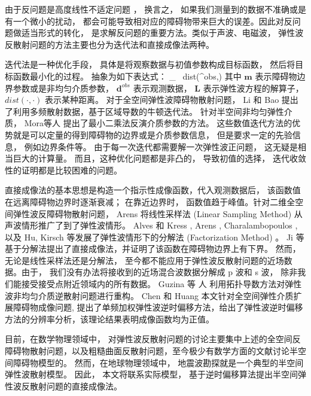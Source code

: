 由于反问题是高度线性不适定问题 \cite{hadamard1923lectures}， 换言之， 如果我们测量到的数据不准确或是有一个微小的扰动， 都会可能导致相对应的障碍物带来巨大的误差。因此对反问题做适当形式的转化， 是求解反问题的重要方法。类似于声波、电磁波， 弹性波反散射问题的方法主要也分为迭代法和直接成像法两种。 

迭代法是一种优化手段， 具体是将观察数据与初值参数构成目标函数， 然后将目标函数最小化的过程。 抽象为如下表达式：
\ben
\min_{} \ dist(^{obs},)
\een
其中 $\mathbf m$ 表示障碍物边界参数或是非均匀介质参数， $\mathbf{d}^{obs}$ 表示观测数据， $\mathbf{{L}}$ 表示弹性波方程的解算子， $dist(\cdot,\cdot)$ 表示某种距离。
对于全空间弹性波障碍物散射问题， Li \cite{li2016inverse} 和 Bao \cite{bao2018direct} 提出了利用多频散射数据，基于区域导数的牛顿迭代法。 针对半空间非均匀弹性介质， Mora等人 \cite{mora1987nonlinear,feng2017elastic,elita2018elastic} 提出了最小二乘法反演介质参数的方法。 这些数值迭代方法的优势就是可以定量的得到障碍物的边界或是介质参数信息， 但是要求一定的先验信息， 例如边界条件等。 由于每一次迭代都需要解一次弹性波正问题， 这无疑是相当巨大的计算量。 而且，这种优化问题都是非凸的， 导致初值的选择， 迭代收敛性的证明都是比较困难的问题。 

直接成像法的基本思想是构造一个指示性成像函数，代入观测数据后， 该函数值在远离障碍物边界时逐渐衰减； 在靠近边界时， 函数值趋于峰值。针对二维全空间弹性波反障碍物散射问题， Arens \cite{arens2001linear} 将线性采样法 (Linear Sampling Method) 从声波情形推广了到了弹性波情形。  Alves 和 Kress \cite{alves2002far}, Arens \cite{arens2001linear}, Charalambopoulos \cite{charalambopoulos2006factorization}, 以及  Hu, Kirsch \cite{hu2012some} 等发展了弹性波情形下的分解法 (Factorization Method) 。 Ji 等 \cite{ji2018direct} 基于分解法提出了直接成像法，并证明了该函数在障碍物边界上有下界。 然而， 无论是线性采样法还是分解法， 至今都不能应用于弹性波反散射问题的近场数据。由于， 我们没有办法将接收到的近场混合波数据分解成 p 波和 s 波， 除非我们能接受接受点附近领域内的所有数据。 Guzina 等
人 \cite{gintides2012identification} 利用拓扑导数方法对弹性波非均匀介质逆散射问题进行重构。 Chen 和 Huang \cite{ela_reverse} 本文针对全空间弹性介质扩展障碍物成像问题, 提出了单频加权弹性波逆时偏移方法，给出了弹性波逆时偏移方法的分辨率分析，该理论结果表明成像函数均为正值。

目前，在数学物理领域中， 对弹性波反散射问题的讨论主要集中上述的全空间反障碍物散射问题，以及粗糙曲面反散射问题\cite{hu2016factorization,li2016near,liu2019near,hu2018direct}，至今极少有数学方面的文献讨论半空间障碍物模型的。 然而，在地球物理领域中， 地震波勘探就是一个典型的半空间弹性波散射模型。 因此， 本文将联系实际模型， 基于逆时偏移算法提出半空间弹性波反散射问题的直接成像法。



